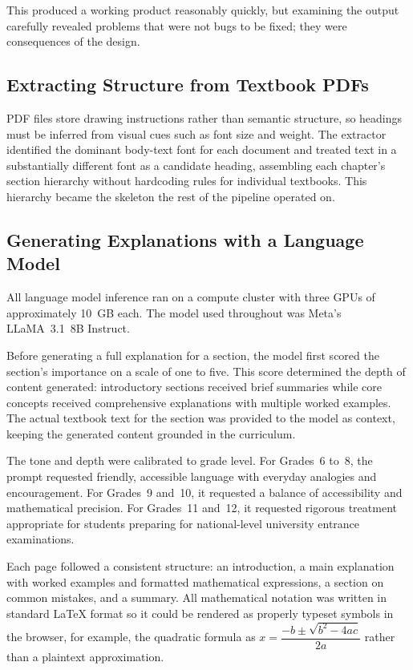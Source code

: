 \documentclass[12pt,a4paper]{article}
\begin{document}
This produced a working product reasonably quickly,
but examining the output carefully revealed problems that were not bugs to be fixed;
they were consequences of the design.

\subsection{Extracting Structure from Textbook PDFs}

PDF files store drawing instructions rather than semantic structure, so headings must be
inferred from visual cues such as font size and weight.
The extractor identified the dominant body-text font for each document and treated text
in a substantially different font as a candidate heading, assembling each chapter's
section hierarchy without hardcoding rules for individual textbooks.
This hierarchy became the skeleton the rest of the pipeline operated on.

\subsection{Generating Explanations with a Language Model}

All language model inference ran on a compute cluster with three GPUs of approximately
10~GB each.
The model used throughout was Meta's LLaMA~3.1~8B Instruct.

Before generating a full explanation for a section,
the model first scored the section's importance on a scale of one to five.
This score determined the depth of content generated:
introductory sections received brief summaries while core concepts
received comprehensive explanations with multiple worked examples.
The actual textbook text for the section was provided to the model as context,
keeping the generated content grounded in the curriculum.

The tone and depth were calibrated to grade level.
For Grades~6 to~8, the prompt requested friendly, accessible language with everyday
analogies and encouragement.
For Grades~9 and~10, it requested a balance of accessibility and mathematical precision.
For Grades~11 and~12, it requested rigorous treatment appropriate for students
preparing for national-level university entrance examinations.

Each page followed a consistent structure: an introduction, a main explanation with
worked examples and formatted mathematical expressions, a section on common mistakes,
and a summary.
All mathematical notation was written in standard \LaTeX{} format so it could be rendered
as properly typeset symbols in the browser, for example, the quadratic formula as
$x = \dfrac{-b \pm \sqrt{b^2 - 4ac}}{2a}$ rather than a plaintext approximation.
\end{document}
